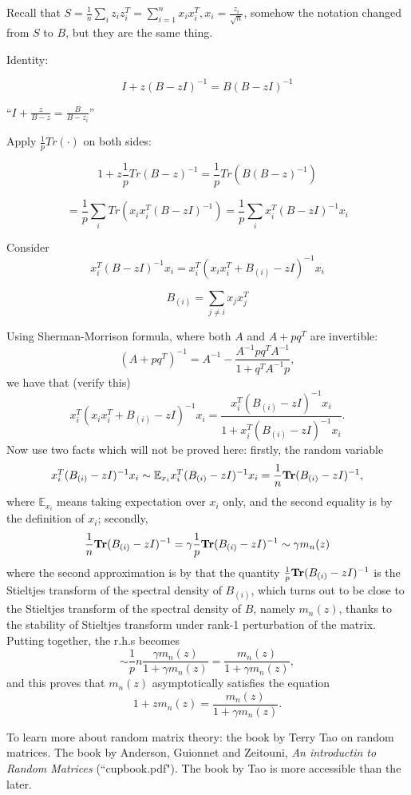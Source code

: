\documentclass[12pt]{article}
\theoremstyle{plain}
\newcommand{\Tr}{{\bf Tr}}
\newcommand{\E}{\mathbb{E}}
\begin{document}
Recall that $S = \frac{1}{n} \sum_{i} z_i z_i^T = \sum_{i=1}^n x_i x_i^T, x_i = \frac{z_i}{\sqrt{n}} $, somehow the notation changed from $S$ to $B$, but they are the same thing.

Identity:

$$ I + z(B-z I)^{-1}= B(B- z I)^{-1} $$

``$I + \frac{z}{B-z} = \frac{B}{B-z_i}$''

Apply $\frac{1}{p} Tr(\cdot)$ on both sides:

$$ 1 + z \frac{1}{p} Tr(B - z)^{-1} = \frac{1}{p} Tr(B (B- z)^{-1}) $$

$$ = \frac{1}{p} \sum_i Tr(x_i x_i^T (B- z I)^{-1}) = \frac{1}{p} \sum_i x_i^T(B - z I)^{-1} x_i  $$

Consider
$$ x_i^T(B - z I)^{-1} x_i = x_i^T(x_ix_i^T + B_{(i)}  - z I)^{-1} x_i $$

$$ B_{(i)} = \sum_{j \neq i} x_j x_j^T $$

Using Sherman-Morrison formula, where both $A$ and $A+pq^T$ are invertible:
\[
(A+pq^T)^{-1} = A^{-1} - \frac{ A^{-1} p q^T A^{-1}  }{1+q^T A^{-1} p },
\]
we have that (verify this)
\[
x_i^T(x_ix_i^T + B_{(i)}  - z I)^{-1} x_i = \frac{ x_i^T (B_{(i)}  - z I)^{-1} x_i}{ 1+ x_i^T (B_{(i)}  - z I)^{-1} x_i }.
\]
Now use two facts which will not be proved here: firstly, the random variable 
\[
x_i^T (B_{(i)}  - z I)^{-1} x_i \sim \E_{x_i} x_i^T (B_{(i)}  - z I)^{-1} x_i = \frac{1}{n} \Tr (B_{(i)}  - z I)^{-1}, 
\]
where $ \E_{x_i}$ means taking expectation over $x_i$ only, 
and the second equality is by the definition of $x_i$;
secondly, 
\[
\frac{1}{n} \Tr (B_{(i)}  - z I)^{-1} = \gamma \frac{1}{p} \Tr (B_{(i)}  - z I)^{-1} \sim \gamma m_n(z) 
\]
where the second approximation is by that the quantity 
$ \frac{1}{p} \Tr ( B_{(i)}  - z I)^{-1}  $ is the Stieltjes transform of the spectral density of $B_{(i)}$,
which turns out to be close to the  Stieltjes transform of the spectral density of $B$, namely $m_n(z)$,
thanks to the stability of Stieltjes transform  under rank-1 perturbation of the matrix. 
Putting together, the r.h.s becomes 
\[
\sim \frac{1}{p} n \frac{\gamma m_n(z) }{1+ \gamma m_n(z) }
= \frac{m_n(z) }{1+ \gamma m_n(z) },
\]
and this proves that $m_n(z)$ asymptotically satisfies the equation 
\[
1 + z m_n(z) = \frac{m_n(z) }{1+ \gamma m_n(z) }.
\]


To learn more about  random matrix theory: the book by Terry Tao on random matrices. 
The book by Anderson, Guionnet and Zeitouni, {\it An introductin to Random Matrices} (``cupbook.pdf").
The book by Tao is more accessible than the later.
\end{document}
